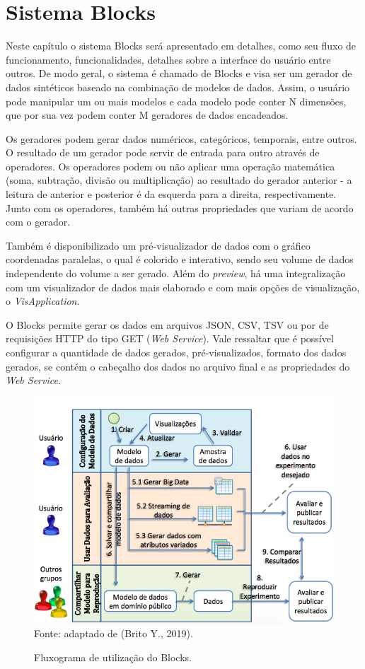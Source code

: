 \documentclass[
	12pt,				%
	openright,			%
	oneside,			%
	a4paper,			%
	english,			%
	brazil				%
	]{abntex2}
\begin{document}
\chapter{Sistema Blocks}
	Neste capítulo o sistema Blocks será apresentado em detalhes, como seu fluxo de funcionamento, funcionalidades, detalhes sobre a interface do usuário entre outros.
	De modo geral, o sistema é chamado de Blocks e visa ser um gerador de dados sintéticos baseado na combinação de modelos de dados.
	Assim, o usuário pode manipular um ou mais modelos e cada modelo pode conter N dimensões, que por sua vez podem conter M geradores de dados encadeados.
	\par
	Os geradores podem gerar dados numéricos, categóricos, temporais, entre outros. 
	O resultado de um gerador pode servir de entrada para outro através de operadores.
	Os operadores podem ou não aplicar uma operação matemática (soma, subtração, divisão ou multiplicação) ao resultado do gerador anterior - a leitura de anterior e posterior é da esquerda para a direita, respectivamente.
	Junto com os operadores, também há outras propriedades que variam de acordo com o gerador.
	\par
	Também é disponibilizado um pré-visualizador de dados com o gráfico coordenadas paralelas, o qual é colorido e interativo, sendo seu volume de dados independente do volume a ser gerado.
	Além do \emph{preview}, há uma integralização com um visualizador de dados mais elaborado e com mais opções de visualização, o \emph{VisApplication}.
	\par
	O Blocks permite gerar os dados em arquivos JSON, CSV, TSV ou por de requisições HTTP do tipo GET (\emph{Web Service}).
	Vale ressaltar que é possível configurar a quantidade de dados gerados, pré-visualizados, formato dos dados gerados, se contém o cabeçalho dos dados no arquivo final e as propriedades do \emph{Web Service}.
	\begin{figure}[h]
		\centering
		\caption{Fluxograma de utilização do Blocks.}
		\includegraphics[width=\linewidth]{./figures/prototipo/fluxogramaUtilizacaoBlocks.png}
		\label{fig:fluxograma}
		\footnotesize Fonte: adaptado de (Brito Y., 2019).
	\end{figure}
\end{document}
